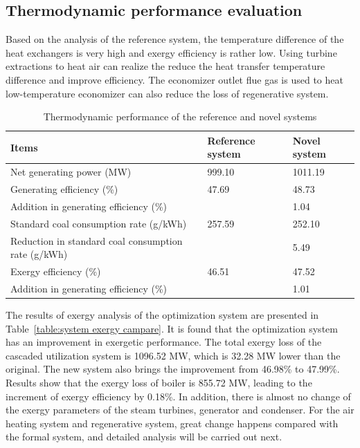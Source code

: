 \documentclass[preprint,12pt]{elsarticle}
\begin{document}
\subsection{Thermodynamic performance evaluation} %
\label{sub:Thermodynamic_evaluation}
Based on the analysis of the reference system, the temperature difference of the heat exchangers is very high and exergy efficiency is rather low.
Using turbine extractions to heat air can realize the reduce the heat transfer temperature difference and improve efficiency. 
The economizer outlet flue gas is used to heat low-temperature economizer can also reduce the loss of regenerative system.



\begin{table}
\caption{Thermodynamic performance of the reference and novel systems}
\label{table:thermal performance compare}
\centering
\begin{tabular}{p{7.5cm}p{1.75cm}p{1.75cm}}
\toprule 
Items & Reference system & Novel system\tabularnewline
\midrule
Net generating power (MW) & 999.10 & 1011.19\tabularnewline
Generating efficiency (\%) & 47.69 & 48.73\tabularnewline
Addition in generating efficiency (\%) &  & 1.04\tabularnewline
Standard coal consumption rate (g/kWh) & 257.59 & 252.10\tabularnewline
Reduction in standard coal consumption rate (g/kWh) &  & 5.49\tabularnewline
Exergy efficiency (\%) & 46.51 & 47.52\tabularnewline
Addition in generating efficiency (\%) &  & 1.01\tabularnewline
\bottomrule
\end{tabular}
\end{table}
The results of exergy analysis of the optimization system are presented in Table~\ref{table:system exergy campare}. 
It is found that the optimization system has an improvement in exergetic performance.
 The total exergy loss of the cascaded utilization system is 1096.52 MW, which is 32.28 MW lower than the original. 
 The new system also brings the improvement from 46.98\% to 47.99\%. 
 Results show that the exergy loss of boiler is 855.72 MW, leading to the increment of exergy efficiency by 0.18\%. In addition, there is almost no change of the exergy parameters of the steam turbines, generator and condenser. 
 For the air heating system and regenerative system, great change happens compared with the formal system, and detailed analysis will be carried out next.
\end{document}
